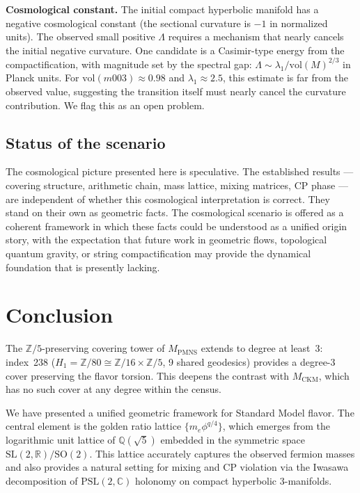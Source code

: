 ﻿\documentclass[12pt]{article}
\theoremstyle{definition}
\begin{document}
\textbf{Cosmological constant.} The initial compact hyperbolic
manifold has a negative cosmological constant (the sectional curvature
is $-1$ in normalized units). The observed small positive $\Lambda$
requires a mechanism that nearly cancels the initial negative
curvature. One candidate is a Casimir-type energy from the
compactification, with magnitude set by the spectral gap:
$\Lambda \sim \lambda_1 / \mathrm{vol}(M)^{2/3}$ in Planck units.
For $\mathrm{vol}(m003) \approx 0.98$ and $\lambda_1 \approx 2.5$,
this estimate is far from the observed value, suggesting the
transition itself must nearly cancel the curvature contribution.
We flag this as an open problem.

\subsection{Status of the scenario}

The cosmological picture presented here is speculative. The
established results --- covering structure, arithmetic chain, mass
lattice, mixing matrices, CP phase --- are independent of whether
this cosmological interpretation is correct. They stand on their own
as geometric facts. The cosmological scenario is offered as a
coherent framework in which these facts could be understood as a
unified origin story, with the expectation that future work in
geometric flows, topological quantum gravity, or string
compactification may provide the dynamical foundation that is
presently lacking.

\section{Conclusion}
\label{sec:conclusion}

The $\mathbb{Z}/5$-preserving covering tower of $M_\text{PMNS}$ extends to degree at least~3: index~238 ($H_1=\mathbb{Z}/80\cong\mathbb{Z}/16\times\mathbb{Z}/5$, 9 shared geodesics) provides a degree-3 cover preserving the flavor torsion. This deepens the contrast with $M_\text{CKM}$, which has no such cover at any degree within the census.

We have presented a unified geometric framework for Standard Model flavor. The central element is the golden ratio lattice $\{m_e \phi^{q/4}\}$, which emerges from the logarithmic unit lattice of $\mathbb{Q}(\sqrt5)$ embedded in the symmetric space $\mathrm{SL}(2,\mathbb{R})/\mathrm{SO}(2)$. This lattice accurately captures the observed fermion masses and also provides a natural setting for mixing and CP violation via the Iwasawa decomposition of $\mathrm{PSL}(2,\mathbb{C})$ holonomy on compact hyperbolic 3-manifolds.
\end{document}
